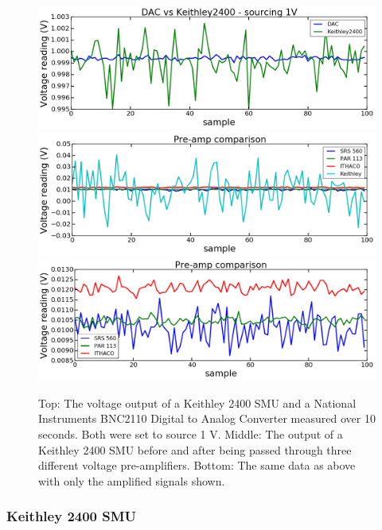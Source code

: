 \documentclass[edeposit,fullpage,draftthesis]{uiucthesis2009}
\begin{document}
        \begin{figure}
            \centering
            \includegraphics[width=0.75\linewidth]{images/experimentaltechniques/DACvKeithley.png}\\
            \includegraphics[width=0.75\linewidth]{images/experimentaltechniques/preams_k.png}\\
            \includegraphics[width=0.75\linewidth]{images/experimentaltechniques/preamps.png}
            \caption[Noise characteristics of electronic measurement instruments]{
                Top: The voltage output of a Keithley 2400 SMU and a National Instruments BNC2110 Digital to Analog Converter
                measured over 10 seconds. Both were set to source 1 V.
                Middle: The output of a Keithley 2400 SMU before and after being passed through three different
                voltage pre-amplifiers.
                Bottom: The same data as above with only the amplified signals shown.
                }
            \label{fig:electronics_noise}
        \end{figure}
            
            \subsubsection*{Keithley 2400 SMU} 
            
\end{document}
